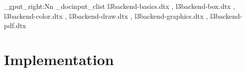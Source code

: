 \documentclass{l3doc}
\begin{document}
\makeatletter
\let\DelayPrintIndex\PrintIndex
\let\PrintIndex\@empty
\makeatother

\ExplSyntaxOn
\clist_gput_right:Nn \g_docinput_clist
  {
    l3backend-basics.dtx   ,
    l3backend-box.dtx      ,
    l3backend-color.dtx    ,
    l3backend-draw.dtx     ,
    l3backend-graphics.dtx ,
    l3backend-pdf.dtx
  }
\ExplSyntaxOff

\part{Implementation}

\def\maketitle{}
\EnableImplementation
\DisableDocumentation
\DocInputAgain

\clearpage

\DelayPrintIndex
\end{document}
